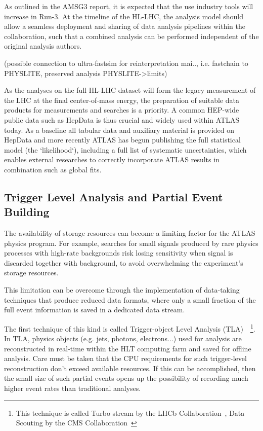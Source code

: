 As outlined in the AMSG3 report, it is expected that the use industry tools will increase in Run-3. At the timeline of the HL-LHC, the analysis model should allow a seamless deployment and sharing of data analysis pipelines within the collaboration, such that a combined analysis can be performed independent of the original analysis authors.

(possible connection to ultra-fastsim for reinterpretation mai.., i.e. fastchain to PHYSLITE, preserved analysis PHYSLITE->limits)

As the analyses on the full HL-LHC dataset will form the legacy measurement of the LHC at the final center-of-mass energy, the preparation of suitable data products for measurements and searches is a priority. A common HEP-wide public data such as HepData is thus crucial and widely used within ATLAS today. As a baseline all tabular data and auxiliary material is provided on HepData and more recently ATLAS has begun publishing the full statistical model (the `likelihood`), including a full list of systematic uncertainties, which enables external researches to correctly incorporate ATLAS results in combination such as global fits.

\subsection{Trigger Level Analysis and Partial Event Building}


The availability of storage resources can become a limiting factor for the ATLAS physics program. 
For example, searches for small signals produced by rare physics processes with high-rate backgrounds risk losing sensitivity when signal is discarded together with background, to avoid overwhelming the experiment's storage resources. 

This limitation can be overcome through the implementation of data-taking techniques that produce reduced data formats, where only a small fraction of the full event information is saved in a dedicated data stream. 

The first technique of this kind is called Trigger-object Level Analysis (TLA)~\cite{EXOT-2016-20}~\footnote{This technique is called Turbo stream by the LHCb Collaboration~\cite{Aaij:2016rxn}, Data Scouting by the CMS Collaboration~\cite{Khachatryan:2016ecr}}. In TLA, physics objects (e.g. jets, photons, electrons...) used for analysis are reconstructed in real-time within the HLT computing farm and saved for offline analysis. 
Care must be taken that the CPU requirements for such trigger-level reconstruction don't exceed available resources. If this can be accomplished, then the small size of such partial events opens up the possibility of recording much higher event rates than traditional analyses. 

